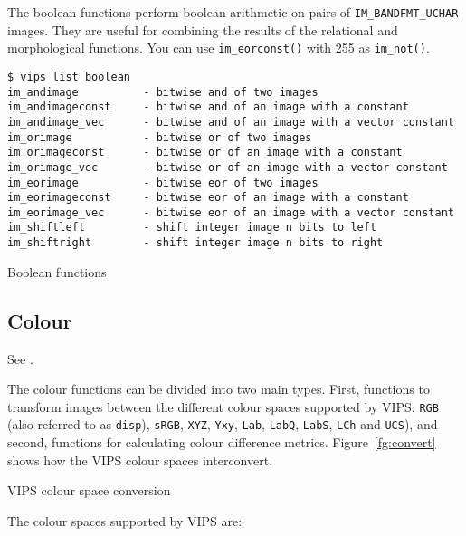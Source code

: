 The boolean functions perform boolean arithmetic on pairs of
\verb+IM_BANDFMT_UCHAR+ images. They are useful for combining the results of
the relational and morphological functions. You can use 
\verb+im_eorconst()+ with 255 as \verb+im_not()+.

\begin{fig2}
\begin{verbatim}
$ vips list boolean
im_andimage          - bitwise and of two images
im_andimageconst     - bitwise and of an image with a constant
im_andimage_vec      - bitwise and of an image with a vector constant
im_orimage           - bitwise or of two images
im_orimageconst      - bitwise or of an image with a constant
im_orimage_vec       - bitwise or of an image with a vector constant
im_eorimage          - bitwise eor of two images
im_eorimageconst     - bitwise eor of an image with a constant
im_eorimage_vec      - bitwise eor of an image with a vector constant
im_shiftleft         - shift integer image n bits to left
im_shiftright        - shift integer image n bits to right
\end{verbatim}
\caption{Boolean functions}
\label{fg:boolean}
\end{fig2}

\subsection{Colour}
\label{sec:colour}

See .

The colour functions can be divided into two main types. First, functions to
transform images between the different colour spaces supported by VIPS:
\verb+RGB+ (also referred to as \verb+disp+), \verb+sRGB+,  \verb+XYZ+,
\verb+Yxy+, \verb+Lab+, \verb+LabQ+, \verb+LabS+, \verb+LCh+ and
\verb+UCS+), and second, functions for calculating colour difference
metrics. Figure~\ref{fg:convert} shows how the VIPS colour spaces
interconvert.

\begin{fig2}
\caption{VIPS colour space conversion}
\label{fg:convert}
\end{fig2}

The colour spaces supported by VIPS are:

